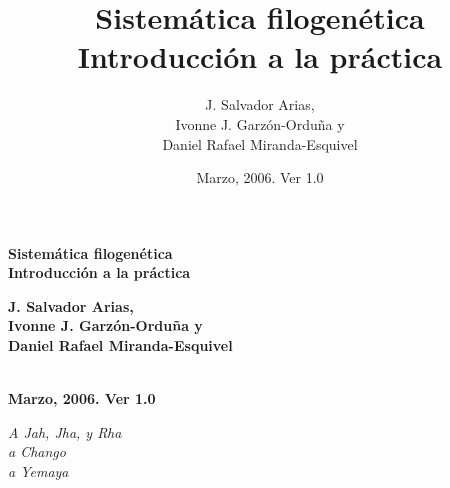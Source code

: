 \documentclass[10pt,twoside,letterpaper]{book}
\title{Sistem\'atica filogen\'etica\\Introducci\'on a la pr\'actica}
\author{J. Salvador Arias,\\Ivonne J. Garz\'on-Ordu\~na y\\Daniel Rafael Miranda-Esquivel}
\date{Marzo, 2006. Ver 1.0}
\begin{document}
 \thispagestyle{empty}
  \null
  \vspace{60mm}
  \begin{center}
  \Huge{\textbf{Sistem\'atica filogen\'etica\\Introducci\'on a la pr\'actica}}
  \end{center}
  \vfill
 \pagebreak

 \thispagestyle{empty}
  \null
  \vspace{10mm}
  \begin{center}
  \Large{\textbf{J. Salvador Arias,\\Ivonne J. Garz\'on-Ordu\~na y\\Daniel Rafael Miranda-Esquivel}}
  \end{center}
  \vspace{40mm}
  \begin{center}
  \Huge{\textbf{\\Marzo, 2006. Ver 1.0}}
  \end{center}
  \vspace{50mm}
 \pagebreak
 \thispagestyle{empty}
\frontmatter
 \thispagestyle{empty}
 \null
  \vfill
  \begin{center}{\Large
   \textit{A Jah, Jha, y Rha\\
   a Chango\\
   a Yemaya}}
  \end{center}
  \vfill
 \pagebreak
   \thispagestyle{empty}

\setcounter{page}{0}
 \pagestyle{fancyplain}
  \cfoot[]{} %
 \tableofcontents



\mainmatter
\renewcommand{\chaptermark}[1]{\markboth{\thechapter{}. #1}{}}
\renewcommand{\sectionmark}[1]{\markright{\thesection{}. #1}}
\lhead[\fancyplain{}{\thepage}]
    {\fancyplain{}{\rightmark}}%
\rhead[\fancyplain{}{\leftmark}]%
    {\fancyplain{}{\thepage}}
\renewcommand{\baselinestretch}{0.75}


\mainmatter
% 

\setcounter{page}{0}
 \thispagestyle{empty}
  \null












\small

\appendix
\small


\end{document}
